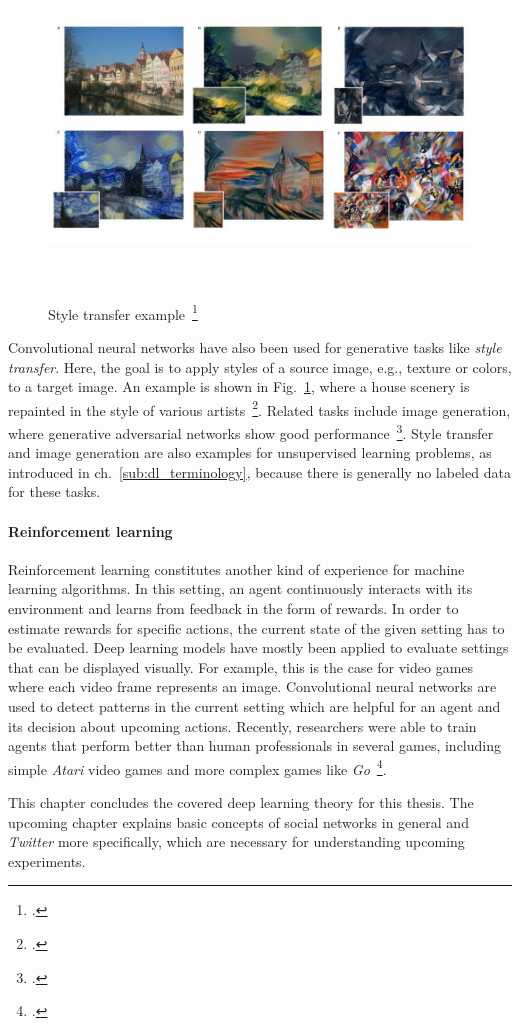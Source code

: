\begin{figure}[h]
  \centering
  \includegraphics[height=9cm]{img/style_transfer.jpg}
  \caption[Style transfer example]{Style transfer example~\footcite{Gatys2015}}
\label{fig:style_transfer}
\end{figure}

Convolutional neural networks have also been used for generative tasks like
\textit{style transfer}.
Here, the goal is to apply styles of a source image, e.g., texture or colors,
to a target image.
An example is shown in Fig.~\ref{fig:style_transfer}, where a house scenery is
repainted in the style of various artists~\footcite{Gatys2015}.
Related tasks include image generation, where generative adversarial networks
show good performance~\footcite{Radford2015}.
Style transfer and image generation are also examples for unsupervised learning
problems, as introduced in ch.~\ref{sub:dl_terminology}, because there is
generally no labeled data for these tasks.

\paragraph{Reinforcement learning}
\label{sub:dl_app_rl}

Reinforcement learning constitutes another kind of experience for machine
learning algorithms.
In this setting, an agent continuously interacts with its environment and learns
from feedback in the form of rewards.
In order to estimate rewards for specific actions, the current state of the
given setting has to be evaluated.
Deep learning models have mostly been applied to evaluate settings that can
be displayed visually.
For example, this is the case for video games where each video frame represents an image.
Convolutional neural networks are used to detect patterns in the current
setting which are helpful for an agent and its decision about upcoming
actions.
Recently, researchers were able to train agents that perform better than human
professionals in several games, including simple \textit{Atari} video games
and more complex games like \textit{Go}~\footcite{Mnih2015, Silver2016}.

This chapter concludes the covered deep learning theory for this thesis.
The upcoming chapter explains basic concepts of social networks in general and
\textit{Twitter} more specifically, which are necessary for understanding
upcoming experiments.
